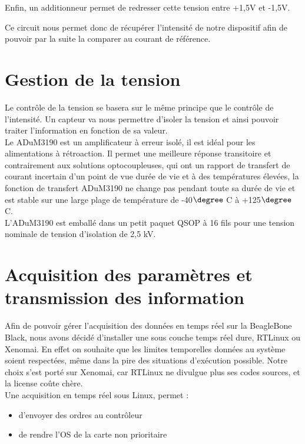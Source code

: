 \documentclass{report}
\begin{document}
\begin{center}
\end{center}

Enfin, un additionneur permet de redresser cette tension entre +1,5V et -1,5V. \\

\begin{center}
\end{center}

Ce circuit nous permet donc de r\'{e}cup\'{e}rer l’intensit\'{e} de notre dispositif afin de pouvoir par la
suite la comparer au courant de r\'{e}f\'{e}rence.

\section{Gestion de la tension}

Le contrôle de la tension se basera sur le m\^{e}me principe que le contrôle de l’intensit\'{e}. Un
capteur va nous permettre d’isoler la tension et ainsi pouvoir traiter l’information en
fonction de sa valeur.\\



Le ADuM3190 est un amplificateur \`{a} erreur isol\'{e}, il est id\'{e}al pour les alimentations \`{a}
r\'{e}troaction. Il permet une meilleure r\'{e}ponse transitoire et contrairement aux solutions
optocoupleuses, qui ont un rapport de transfert de courant incertain d’un point de vue
dur\'{e}e de vie et \`{a} des temp\'{e}ratures \'{e}lev\'{e}es, la fonction de transfert ADuM3190 ne change
pas pendant toute sa dur\'{e}e de vie et est stable sur une large plage de temp\'{e}rature de 
-40$\degree$ C \`{a} +125$\degree$ C.\\
L'ADuM3190 est emball\'{e} dans un petit paquet QSOP \`{a} 16 fils pour une tension nominale de
tension d'isolation de 2,5 kV.

\section{Acquisition des param\`{e}tres et transmission des information}

Afin de pouvoir g\'{e}rer l’acquisition des donn\'{e}es en temps r\'{e}el sur la BeagleBone Black, nous
avons d\'{e}cid\'{e} d’installer une sous couche temps r\'{e}el dure, RTLinux ou Xenomai. En effet on
souhaite que les limites temporelles donn\'{e}es au syst\`{e}me soient respect\'{e}es, m\^{e}me dans la
pire des situations d’ex\'{e}cution possible. Notre choix s’est port\'{e} sur Xenomai, car RTLinux ne
divulgue plus ses codes sources, et la license coûte ch\`{e}re.\\
Une acquisition en temps r\'{e}el sous Linux, permet :
\begin{itemize}
 \item d’envoyer des ordres au contrôleur
 \item de rendre l’OS de la carte non prioritaire
\end{itemize}
\end{document}

